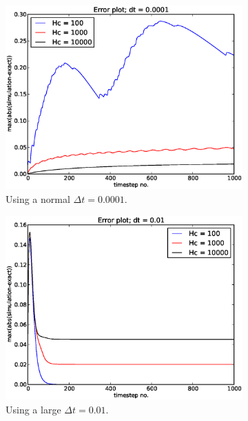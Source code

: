 \begin{figure}[H]
\centering
\begin{subfigure}[b]{0.48\textwidth}
 \includegraphics[width=\textwidth]{../doc/results/experiment_19112013_1625/results/errorplot.eps}
 \caption{Using a normal $\Delta t = 0.0001$.}
 \label{errorplot_BE1D_small_dt}
\end{subfigure}
\begin{subfigure}[b]{0.48\textwidth}
 \includegraphics[width=\textwidth]{../doc/results/experiment_19112013_1627/results/errorplot.eps}
 \caption{Using a large $\Delta t = 0.01$.}
 \label{errorplot_BE1D_walk_large_dt}
\end{subfigure}
\caption{}
\label{testing_dt_size}
\end{figure}

